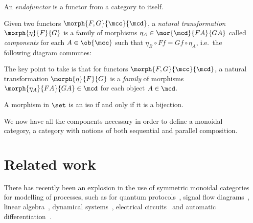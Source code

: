 \begin{definition}[Endofunctor]
    An \emph{endofunctor} is a functor from a category to itself.
\end{definition}

\begin{definition}
    Given two functors \(\morph{F, G}{\mcc}{\mcd}\), a
    \emph{natural transformation} \(\morph{\eta}{F}{G}\) is a family of
    morphisms \(
        \eta_A \in \mor{\mcd}{FA}{GA}
    \) called \emph{components} for each \(A \in \ob{\mcc}\) such that \(
        \eta_B \circ Ff = Gf \circ \eta_A
    \), i.e.\ the following diagram commutes:
    \begin{center}
        
    \end{center}
\end{definition}

The key point to take is that for functors \(\morph{F,G}{\mcc}{\mcd}\), a
natural transformation \(\morph{\eta}{F}{G}\) is a \emph{family} of morphisms
\(\morph{\eta_A}{FA}{GA} \in \mcd\) for each object \(A \in \mcd\).

\begin{example}
    A morphism in \(\set\) is an iso if and only if it is a bijection.
\end{example}

We now have all the components necessary in order to define a monoidal category,
a category with notions of both sequential and parallel composition.

\section{Related work}

There has recently been an explosion in the use of symmetric monoidal categories
for modelling of processes, such as for quantum
protocols~\cite{abramsky2004categorical}, signal flow
diagrams~\cite{bonchi2014categorical,bonchi2015full}, linear
algebra~\cite{bonchi2017interacting,zanasi2015interacting,bonchi2019graphical,boisseau2022graphical},
dynamical systems~\cite{baez2015categories,fong2016categorical}, electrical
circuits~\cite{boisseau2022string} and automatic
differentiation~\cite{alvarez-picallo2023functorial}.